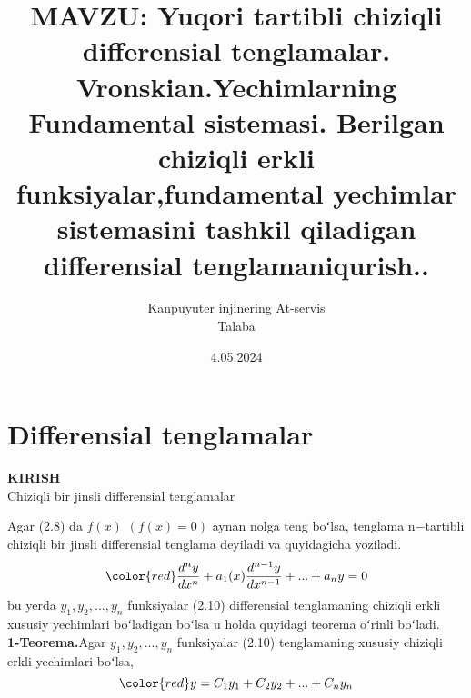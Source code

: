 \documentclass{beamer}
\begin{document}
\title[DIFFERENSIAL TENGLAMALAR]{MAVZU: Yuqori tartibli chiziqli differensial tenglamalar. Vronskian.Yechimlarning Fundamental sistemasi. Berilgan chiziqli erkli funksiyalar,fundamental yechimlar sistemasini tashkil qiladigan differensial tenglamaniqurish..}
\author[Ahmadaliyev Azizali]{Kanpuyuter injinering At-servis\\Talaba}
\date[Math Project Presentation]{4.05.2024}


\begin{frame}
\titlepage %
\end{frame}


\section{Differensial tenglamalar} %

\begin{frame}
\begin{center}
\color{red}
  \textbf{KIRISH}
  \\Chiziqli bir jinsli differensial tenglamalar\\
\end{center} 
Agar (2.8) da $f(x)$ $(f(x) = 0)$ aynan nolga teng boʻlsa, tenglama n−tartibli chiziqli bir jinsli differensial tenglama deyiladi va quyidagicha yoziladi.
\begin{equation}
\color{red} \dfrac{d^{n}y}{dx^{n}} + a_{1}(x)\dfrac{d^{n-1}y}{dx^{n-1}}+...+a_{n} y = 0    
\end{equation}
bu yerda $y_{1},y_{2},...,y_{n}$  funksiyalar (2.10) differensial tenglamaning chiziqli erkli xususiy yechimlari boʻladigan boʻlsa u holda quyidagi teorema oʻrinli boʻladi.\\
\textbf{1-Teorema.}Agar $y_{1},y_{2},...,y_{n}$ funksiyalar (2.10) tenglamaning xususiy chiziqli erkli yechimlari boʻlsa, 
\begin{equation}
\color{red} y = C_{1}y_{1} + C_{2}y_{2} +...+ C_{n}y_{n}    
\end{equation}
\end{frame}
\end{document}
